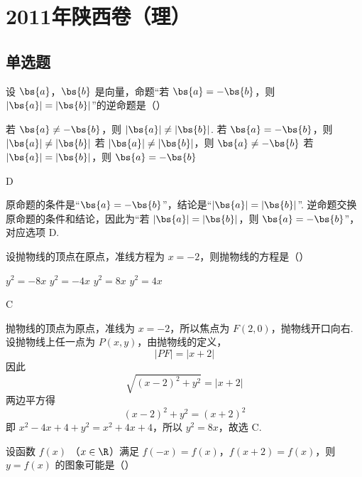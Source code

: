 
\chapter{2011年陕西卷（理）}

\section{单选题}

\begin{problem}
设 \(\bs{a}\)，\(\bs{b}\) 是向量，命题“若 \(\bs{a} = -\bs{b}\)，则 \(|\bs{a}| = |\bs{b}|\)”的逆命题是（\quad）

\choices
    {若 \(\bs{a} \neq -\bs{b}\)，则 \(|\bs{a}| \neq |\bs{b}|\).}
    {若 \(\bs{a} = -\bs{b}\)，则 \(|\bs{a}| \neq |\bs{b}|\)}
    {若 \(|\bs{a}| \neq |\bs{b}|\)，则 \(\bs{a} \neq -\bs{b}\)}
    {若 \(|\bs{a}| = |\bs{b}|\)，则 \(\bs{a} = -\bs{b}\)}
\end{problem}

\begin{answer}
D
\end{answer}

\begin{solution}
原命题的条件是“\(\bs{a}=-\bs{b}\)”，结论是“\(|\bs{a}|=|\bs{b}|\)”. 逆命题交换原命题的条件和结论，因此为“若 \(|\bs{a}|=|\bs{b}|\)，则 \(\bs{a}=-\bs{b}\)”，对应选项 D.
\end{solution}

\begin{problem}
设抛物线的顶点在原点，准线方程为 \(x = -2\)，则抛物线的方程是（\quad）

\choices
    {\( y^{2} = -8x \)}
    {\( y^{2} = -4x \)}
    {\( y^{2} = 8x \)}
    {\( y^{2} = 4x \)}
\end{problem}

\begin{answer}
C
\end{answer}

\begin{solution}
抛物线的顶点为原点，准线为 \(x=-2\)，所以焦点为 \(F(2,0)\)，抛物线开口向右. 设抛物线上任一点为 \(P(x,y)\)，由抛物线的定义，
\[
|PF|=|x+2|
\]
因此
\[
\sqrt{(x-2)^2+y^2}=|x+2|
\]
两边平方得
\[
(x-2)^2+y^2=(x+2)^2
\]
即 \(x^2-4x+4+y^2=x^2+4x+4\)，所以 \(y^2=8x\)，故选 C.
\end{solution}

\begin{problem}
设函数 \( f(x) \) （\(x \in \R\)）满足 \(f(-x) = f(x)\)，\(f(x + 2) = f(x)\)，则 \( y = f(x) \) 的图象可能是（\quad）

    {}
    {}
    {}
\end{problem}

